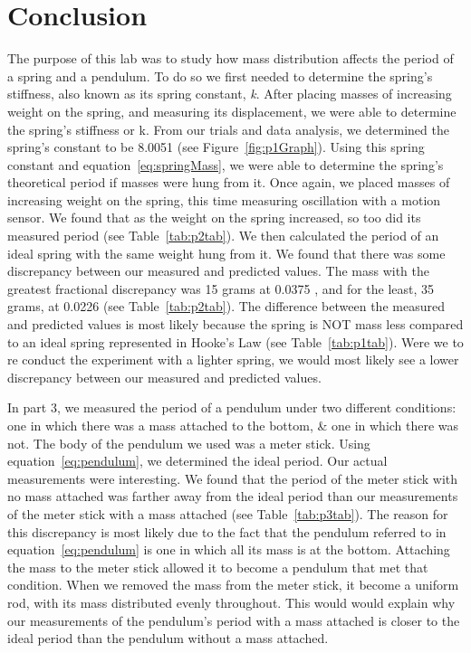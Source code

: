 
\section{Conclusion}

\vspace{-0.5cm}
\singlespacing

The purpose of this lab was to study how mass distribution affects the period of a spring and a pendulum. To do so we first needed to determine the spring's stiffness, also known as its spring constant, \textit{k}. After placing masses of increasing weight on the spring, and measuring its displacement, we were able to determine the spring's stiffness or k. From our trials and data analysis, we determined the spring's constant to be 8.0051 (see Figure~\ref{fig:p1Graph}). Using this spring constant and equation~\ref{eq:springMass}, we were able to determine the spring's theoretical period if masses were hung from it. Once again, we placed masses of increasing weight on the spring, this time measuring oscillation with a motion sensor. We found that as the weight on the spring increased, so too did its measured period (see Table~\ref{tab:p2tab}). We then calculated the period of an ideal spring with the same weight hung from it. We found that there was some discrepancy between our measured and predicted values. The mass with the greatest fractional discrepancy was 15 grams at 0.0375 , and for the least, 35 grams, at 0.0226 (see Table~\ref{tab:p2tab}). The difference between the measured and predicted values is most likely because the spring is NOT mass less compared to an ideal spring represented in Hooke's Law (see Table~\ref{tab:p1tab}). Were we to re conduct the experiment with a lighter spring, we would most likely see a lower discrepancy between our measured and predicted values.


In part 3, we measured the period of a pendulum under two different conditions: one in which there was a mass attached to the bottom, & one in which there was not. The body of the pendulum we used was a meter stick. Using equation~\ref{eq:pendulum}, we determined the ideal period. Our actual measurements were interesting. We found that the period of the meter stick with no mass attached was farther away from the ideal period than our measurements of the meter stick with a mass attached (see Table~\ref{tab:p3tab}). The reason for this discrepancy is most likely due to the fact that the pendulum referred to in equation~\ref{eq:pendulum} is one in which all its mass is at the bottom. Attaching the mass to the meter stick allowed it to become a pendulum that met that condition. When we removed the mass from the meter stick, it become a uniform rod, with its mass distributed evenly throughout. This would would explain why our measurements of the pendulum's period with a mass attached is closer to the ideal period than the pendulum without a mass attached. 

